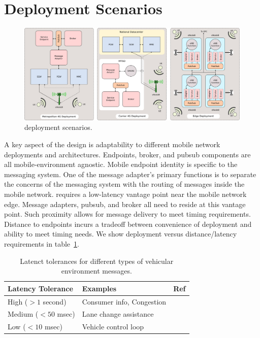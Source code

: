 \section{Deployment Scenarios}
\label{sec:deployments}

\begin{figure}[ht]
  \centering
  \includegraphics[width=\textwidth]{figs/deploy.png}
  \caption{\name{} deployment scenarios.}
  \label{fig:deployments}
\end{figure}

A key aspect of the \name{} design is adaptability to different mobile
network deployments and architectures. Endpoints, broker, and pubsub
components are all mobile-environment agnostic. Mobile endpoint
identity is specific to the \name{} messaging system. One of the message
adapter's primary functions is to separate the concerns of the
messaging system with the routing of messages inside the mobile
network.  \name{} requires a low-latency vantage point near the mobile
network edge. Message adapters, pubsub, and broker all need to reside
at this vantage point.  Such proximity allows for message delivery to
meet timing requirements.  Distance to endpoints incurs a tradeoff between
convenience of deployment and ability to meet timing needs. We show
deployment versus distance/latency requirements in
table~\ref{tab:lat-req}.


\begin{table}[h]
  \centering
  \begin{tabular}{| l | l | l |}
    \hline
    \textbf{Latency Tolerance} & \textbf{Examples} & \textbf{Ref} \\ \hline \hline
    High ($> 1$ second) & Consumer info, Congestion & \cite{camp2005vehicle,papadimitratos2009vehicular} \\ \hline
    Medium ($< 50$ msec) & Lane change assistance & \cite{FIXME} \\ \hline
    Low ($< 10$ msec) & Vehicle control loop & \cite{hansson2002integrating} \\ \hline
    \hline
  \end{tabular}
  \label{tab:lat-req}
  \caption{Latenct tolerances for different types of vehicular environment messages.}
\end{table}

